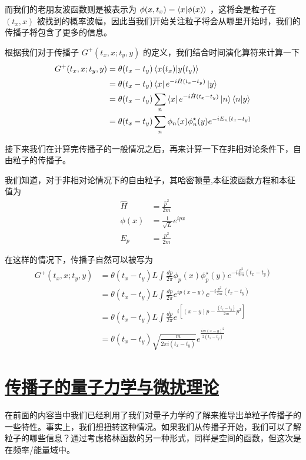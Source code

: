 而我们的老朋友波函数则是被表示为 $\phi(x,t_x) = \braket{x}{\phi(x)}$ ，这将会是粒子在 $(t_x,x)$ 被找到的概率波幅，因此当我们开始关注粒子将会从哪里开始时，我们的传播子将包含了更多的信息。

根据我们对于传播子 $G^{+}(t_x,x;t_y,y)$ 的定义，我们结合时间演化算符来计算一下
\begin{align*}
    G^{+}(t_x,x;t_y,y) &= \theta(t_x - t_y) \braket{x(t_x)}{y(t_y)} \\
    &= \theta(t_x - t_y)\bra{x}e^{-i\hat{H}(t_x - t_y)}\ket{y} \\
    &= \theta(t_x - t_y)\sum_n\bra{x}e^{-i\hat{H}(t_x - t_y)}\ket{n}\bra{n}\ket{y} \\
    &= \theta(t_x - t_y)\sum_n \phi_n(x)\phi_n^\star(y)e^{-iE_n(t_x - t_y)}
\end{align*}

接下来我们在计算完传播子的一般情况之后，再来计算一下在非相对论条件下，自由粒子的传播子。

我们知道，对于非相对论情况下的自由粒子，其哈密顿量,本征波函数方程和本征值为
\begin{align*}
    \hat{H} &= \frac{\hat{p}^2}{2m} \\
    \phi(x) &= \frac{1}{\sqrt{L}}e^{ipx} \\
    E_p &= \frac{p^2}{2m}
\end{align*}

在这样的情况下，传播子自然可以被写为
\begin{align*}
    G^{+}(t_x,x;t_y,y) &= \theta(t_x - t_y) L\int \frac{dp}{2\pi} \phi_p(x) \phi_p^\star(y) e^{-i\frac{p^2}{2m}(t_x - t_y)} \\
    &= \theta(t_x - t_y) L\int \frac{dp}{2\pi} e^{ip(x - y)} e^{-i\frac{p^2}{2m}(t_x - t_y)} \\
    &= \theta(t_x - t_y) L\int \frac{dp}{2\pi} e^{i[(x - y)p - \frac{(t_x - t_y)}{2m}p^2]} \\
    &= \theta(t_x - t_y) \sqrt{\frac{m}{2\pi i(t_x - t_y)}} e^{\frac{im(x - y)^2}{2(t_x - t_y)}}
\end{align*}


\section{\protect\hyperlink{:}{传播子的量子力学与微扰理论}}

在前面的内容当中我们已经利用了我们对量子力学的了解来推导出单粒子传播子的一些特性。事实上，我们想扭转这种情况。如果我们从传播子开始，我们可以了解粒子的哪些信息？通过考虑格林函数的另一种形式，同样是空间的函数，但这次是在频率/能量域中。

